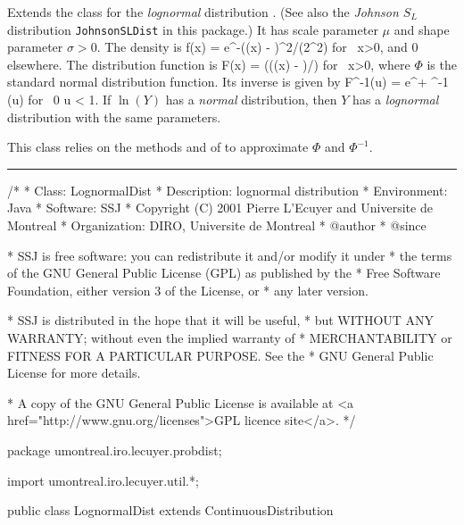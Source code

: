 
Extends the class  for the
{\em lognormal\/} distribution  \cite{tJOH95a}.
(See also the {\em Johnson $S_L$\/} distribution \texttt{JohnsonSLDist}
in this package.) It has scale
parameter $\mu$ and shape parameter $\sigma > 0$.
The density is
\eq
  f(x) = 
      e^{-(\ln (x) - \mu)^2/(2\sigma^2)}
      \qquad\mbox{for }  x>0,                   
\endeq
and 0 elsewhere.  The distribution function is
\eq
  F(x) = \Phi \left({(\ln(x) - \mu)/\sigma}\right) \qquad\mbox{for }  x>0,
\endeq
where $\Phi$ is the standard normal distribution function.
Its inverse is given by
\eq
    F^{-1}(u) = e^{\mu + \sigma\Phi^{-1} (u)}
          \qquad \mbox{for } 0 \le u < 1.
\endeq
If $\ln(Y)$ has a {\em normal\/} distribution, then $Y$ has a
{\em lognormal\/} distribution with the same parameters.

This class relies on the methods
   and
of  to approximate $\Phi$ and $\Phi^{-1}$.

\bigskip\hrule

\begin{code}
\begin{hide}
/*
 * Class:        LognormalDist
 * Description:  lognormal distribution
 * Environment:  Java
 * Software:     SSJ
 * Copyright (C) 2001  Pierre L'Ecuyer and Universite de Montreal
 * Organization: DIRO, Universite de Montreal
 * @author
 * @since

 * SSJ is free software: you can redistribute it and/or modify it under
 * the terms of the GNU General Public License (GPL) as published by the
 * Free Software Foundation, either version 3 of the License, or
 * any later version.

 * SSJ is distributed in the hope that it will be useful,
 * but WITHOUT ANY WARRANTY; without even the implied warranty of
 * MERCHANTABILITY or FITNESS FOR A PARTICULAR PURPOSE.  See the
 * GNU General Public License for more details.

 * A copy of the GNU General Public License is available at
   <a href="http://www.gnu.org/licenses">GPL licence site</a>.
 */
\end{hide}
package umontreal.iro.lecuyer.probdist;
\begin{hide}
import umontreal.iro.lecuyer.util.*;\end{hide}

public class LognormalDist extends ContinuousDistribution\begin{hide} {
   private double mu;
   private double sigma; \end{hide}
\end{code}

